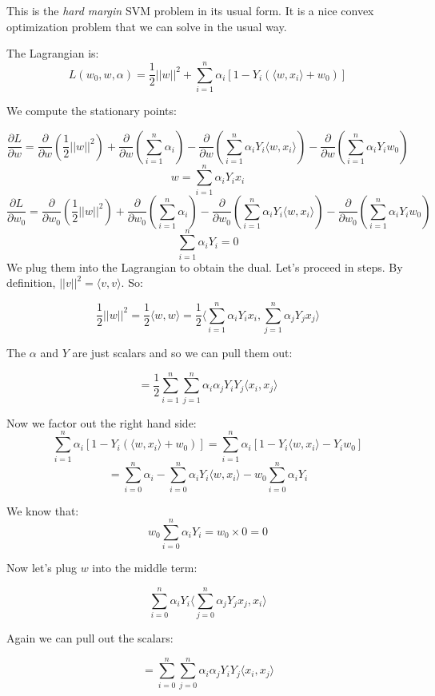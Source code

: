 \documentclass{minimal}
\begin{document}
This is the \textit{hard margin} SVM problem in its usual form.
It is a nice convex optimization problem that we can solve in the usual way.

The Lagrangian is:
$$
L(w_0, w, \alpha) = \frac{1}{2}||w||^2 + \sum_{i=1}^n \alpha_i [1 - Y_i(\langle
w, x_i \rangle + w_0)]
$$

We compute the stationary points:

$$
\frac{\partial L}{\partial w} = \frac{\partial}{\partial w}
\left( \frac{1}{2}||w||^2 \right) + \frac{\partial}{\partial w}
\left(\sum_{i=1}^n \alpha_i \right) - \frac{\partial}{\partial w}\left( \sum_{i=1}^n \alpha_i Y_i \langle
w, x_i \rangle \right) - \frac{\partial}{\partial w} \left( \sum_{i=1}^n
\alpha_i Y_i w_0 \right)
$$
$$
w = \sum_{i=1}^n \alpha_i Y_i x_i
$$
$$
\frac{\partial L}{\partial w_0} = \frac{\partial}{\partial w_0}
\left( \frac{1}{2}||w||^2 \right) + \frac{\partial}{\partial w_0}
\left(\sum_{i=1}^n \alpha_i \right) - \frac{\partial}{\partial w_0}\left( \sum_{i=1}^n \alpha_i Y_i \langle
w, x_i \rangle \right) - \frac{\partial}{\partial w_0} \left( \sum_{i=1}^n
\alpha_i Y_i w_0 \right)
$$
$$
\sum_{i=1}^n \alpha_i Y_i = 0
$$
We plug them into the Lagrangian to obtain the dual. Let's proceed in steps. By
definition, $||v||^2 = \langle v, v \rangle$. So:

$$
\frac{1}{2} ||w||^2 = \frac{1}{2} \langle w, w \rangle = 
\frac{1}{2} \langle \sum_{i=1}^n \alpha_i Y_i x_i, \sum_{j=1}^n \alpha_j Y_j x_j \rangle
$$

The $\alpha$ and $Y$ are just scalars and so we can pull them out:

$$
= \frac{1}{2} \sum_{i=1}^n \sum_{j=1}^n \alpha_i \alpha_j Y_i Y_j \langle x_i, x_j \rangle
$$

Now we factor out the right hand side:
$$
\sum_{i=1}^n \alpha_i [1 - Y_i(\langle w, x_i \rangle + w_0)] = \sum_{i=1}^n
\alpha_i [1 - Y_i \langle w, x_i \rangle - Y_i w_0]
$$
$$
= \sum_{i=0}^n \alpha_i - \sum_{i=0}^n \alpha_i Y_i \langle w, x_i \rangle -
w_0 \sum_{i=0}^n \alpha_i Y_i
$$

We know that:
$$
w_0 \sum_{i=0}^n \alpha_i Y_i = w_0 \times 0 = 0
$$

Now let's plug $w$ into the middle term:

$$
\sum_{i=0}^n \alpha_i Y_i \langle \sum_{j=0}^n \alpha_j Y_j x_j, x_i \rangle
$$

Again we can pull out the scalars:

$$
= \sum_{i=0}^n \sum_{j=0}^n \alpha_i \alpha_j Y_i Y_j \langle x_i, x_j \rangle
$$
\end{document}

